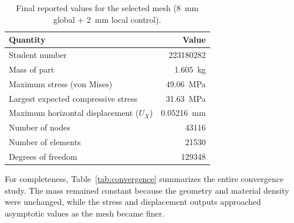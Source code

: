 \documentclass[11pt,a4paper]{article}
\newcommand{\studentnumber}{223180282}
\begin{document}
\begin{table}[H]
    \centering
    \caption{Final reported values for the selected mesh (\SI{8}{mm} global + \SI{2}{mm} local control).}
    \begin{tabular}{>{\raggedright\arraybackslash}p{85mm}r}
        \toprule
        Quantity & Value \\
        \midrule
        Student number & \studentnumber \\
        Mass of part & \SI{1.605}{kg} \\
        Maximum stress (von Mises) & \SI{49.06}{MPa} \\
        Largest expected compressive stress & \SI{31.63}{MPa} \\
        Maximum horizontal displacement ($U_X$) & \SI{0.05216}{mm} \\
        Number of nodes & \num{43116} \\
        Number of elements & \num{21530} \\
        Degrees of freedom & \num{129348} \\
        \bottomrule
    \end{tabular}
    \label{tab:summary}
\end{table}

For completeness, Table~\ref{tab:convergence} summarizes the entire convergence study. The mass remained constant because the geometry and material density were unchanged, while the stress and displacement outputs approached asymptotic values as the mesh became finer.

\begin{table}[H]
    \centering
    \caption{Mesh refinement results and calculated degrees of freedom.}
    \label{tab:convergence}
    {\small
    \setlength{\tabcolsep}{4pt}%
    }
\end{table}
\end{document}
